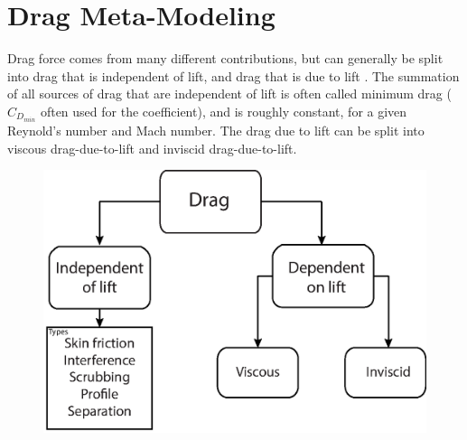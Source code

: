 \chapter{Drag Meta-Modeling}
Drag force comes from many different contributions, but can generally be split into drag that is independent of lift, and drag that is due to lift \cite{nicolaiWhitePaper}. The summation of all sources of drag that are  independent of lift is often called minimum drag ($C_{D_{min}}$ often used for the coefficient)\cite{raymer}, and is roughly constant, for a given Reynold's number and Mach number. The drag due to lift can be split into viscous drag-due-to-lift and inviscid drag-due-to-lift.\\
\begin{figure}[h!]
  \centering
  \includegraphics[width=.6\linewidth]{figures/dragDefinition.eps}
  \label{dragDefFig}
\end{figure}

